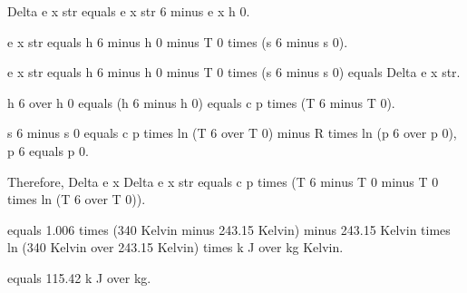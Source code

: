 Delta e x str equals e x str 6 minus e x h 0. 

e x str equals h 6 minus h 0 minus T 0 times (s 6 minus s 0). 

e x str equals h 6 minus h 0 minus T 0 times (s 6 minus s 0) equals Delta e x str. 

h 6 over h 0 equals (h 6 minus h 0) equals c p times (T 6 minus T 0). 

s 6 minus s 0 equals c p times ln (T 6 over T 0) minus R times ln (p 6 over p 0), p 6 equals p 0. 

Therefore, Delta e x Delta e x str equals c p times (T 6 minus T 0 minus T 0 times ln (T 6 over T 0)). 

equals 1.006 times (340 Kelvin minus 243.15 Kelvin) minus 243.15 Kelvin times ln (340 Kelvin over 243.15 Kelvin) times k J over kg Kelvin. 

equals 115.42 k J over kg.
